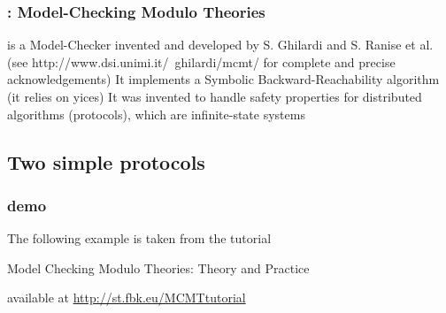 \begin{frame}
  \frametitle{\mcmt: Model-Checking Modulo Theories}

  \mcmt is a Model-Checker invented and developed by S. Ghilardi and S. Ranise et al.
  (see http://www.dsi.unimi.it/~ghilardi/mcmt/ for complete and precise 
   acknowledgements) 
  \vfill
  It implements a Symbolic Backward-Reachability algorithm (it relies on yices)
  \vfill
  It was invented to handle safety properties for 
  distributed algorithms (protocols), which
  are infinite-state systems
   
\end{frame}

\subsection{Two simple protocols}

\begin{frame}
  \frametitle{\mcmt demo}
  The following example is taken from the tutorial 
  \vfill
  \begin{center}
  Model Checking Modulo Theories: Theory and Practice
  \end{center}
  \vfill
  available at \url{http://st.fbk.eu/MCMTtutorial}
\end{frame}

